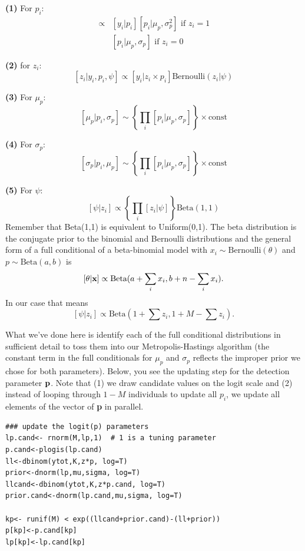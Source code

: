 {\bf (1)} For $p_{i}$:
\begin{eqnarray*}
[p_{i}|y_{i}, \mu_p, \sigma_{p},z_{i}] &\propto  &
[y_{i}|p_{i}][p_{i}|\mu_p,\sigma_{p}^{2}] \mbox{ if $z_{i}=1$ }  \\
                 &  &  [p_{i}|\mu_p,\sigma_{p}] \mbox{ if $z_{i}=0$ }
\end{eqnarray*}

{\bf (2)} for $z_{i}$:
\[
[z_{i} | y_{i}, p_{i}, \psi] \propto [y_{i}|z_{i} \times p_{i}] \mbox{Bernoulli}(z_{i}|\psi)
\]

{\bf (3)} For $\mu_{p}$:
\[
[\mu_{p} | p_{i}, \sigma_{p}] \sim \left\{ \prod_{i} [p_{i}|\mu_{p}, \sigma_{p}] \right\} \times \mbox{const}
\]

{\bf (4)} For $\sigma_{p}$:
\[
[ \sigma_{p}|p_{i}, \mu_{p} ] \sim \left\{ \prod_{i}[p_{i}| \mu_{p},\sigma_{p} ] \right\} \times \mbox{const}
\]

{\bf (5)} For $\psi$:
\[
[\psi|z_{i}] \propto \left\{ \prod_{i} [z_{i}|\psi] \right\} \mbox{Beta}(1,1)
\]
Remember that \mbox{Beta}(1,1) is equivalent to \mbox{Uniform}(0,1). The beta distribution is the conjugate prior to the binomial and
Bernoulli distributions and the general form of a full conditional of a beta-binomial model
with $x_{i} \sim \mbox{Bernoulli} (\theta) $ and $p \sim \mbox{Beta}(a,b)$ is
\[
[\theta|{\bf x}] \propto \mbox{Beta}(a + \sum_i x_i, b + n-\sum_i x_i).
\]
In our case that means
\[
[\psi|z_{i}] \propto \mbox{Beta}(1 + \sum z_{i}, 1 + M - \sum z_{i}).
\]

What we've done here is identify each of the full conditional
distributions in sufficient detail to toss them into our
Metropolis-Hastings algorithm (the constant term in the full
conditionals for $\mu_{p}$ and $\sigma_{p}$ reflects the improper
prior we chose for both parameters).  Below, you see the updating step
for the detection parameter ${\bf p}$. Note that (1) we draw candidate
values on the logit scale and (2) instead of looping through $1 - M$
individuals to update all $p_{i}$, we update all elements of the
vector of {\bf p} in parallel.

\begin{verbatim}
### update the logit(p) parameters
lp.cand<- rnorm(M,lp,1)  # 1 is a tuning parameter
p.cand<-plogis(lp.cand)
ll<-dbinom(ytot,K,z*p, log=T)
prior<-dnorm(lp,mu,sigma, log=T)
llcand<-dbinom(ytot,K,z*p.cand, log=T)
prior.cand<-dnorm(lp.cand,mu,sigma, log=T)

kp<- runif(M) < exp((llcand+prior.cand)-(ll+prior))
p[kp]<-p.cand[kp]
lp[kp]<-lp.cand[kp]
\end{verbatim}

